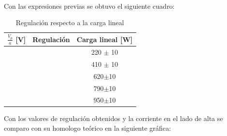 \documentclass[11pt,letterpaper]{article}     %
\begin{document}
Con las expresiones previas se obtuvo el siguiente cuadro:
\begin{table}[H]
\centering
\caption{Regulación respecto a la carga lineal}
\label{Regcuadro}
\begin{tabular}{|c|c|c|}
\hline
\textbf{$\frac{V_{p}}{a}$ {[}V{]}} & \textbf{Regulación} & \textbf{Carga lineal {[}W{]}} \\ \hline
                                   &                     & 220 $\pm$ 10                  \\ \hline
                                   &                     & 410 $\pm$ 10                  \\ \hline
                                   &                     & 620$\pm$10                    \\ \hline
                                   &                     & 790$\pm$10                    \\ \hline
                                   &                     & 950$\pm$10                    \\ \hline
\end{tabular}
\end{table}
Con los valores de regulación obtenidos y la corriente en el lado de alta se comparo con su homologo teórico en la siguiente gráfica:
\end{document}
